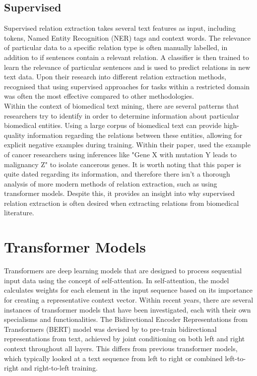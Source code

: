 \documentclass{l4proj}
\begin{document}
\subsection{Supervised}
Supervised relation extraction takes several text features as input, including tokens, Named Entity Recognition (NER) tags and context words. The relevance of particular data to a specific relation type is often manually labelled, in addition to if sentences contain a relevant relation. A classifier is then trained to learn the relevance of particular sentences and is used to predict relations in new text data. Upon their research into different relation extraction methods, \cite{supervised} recognised that using supervised approaches for tasks within a restricted domain was often the most effective compared to other methodologies.
\\
Within the context of biomedical text mining, there are several patterns that researchers try to identify in order to determine information about particular biomedical entities. Using a large corpus of biomedical text can provide high-quality information regarding the relations between these entities, allowing for explicit negative examples during training. Within their paper, \cite{supervised} used the example of cancer researchers using inferences like "Gene X with mutation Y leads to malignancy Z" to isolate cancerous genes. It is worth noting that this paper is quite dated regarding its information, and therefore there isn't a thorough analysis of more modern methods of relation extraction, such as using transformer models. Despite this, it provides an insight into why supervised relation extraction is often desired when extracting relations from biomedical literature.

\section{Transformer Models}
Transformers are deep learning models that are designed to process sequential input data using the concept of self-attention. In self-attention, the model calculates weights for each element in the input sequence based on its importance for creating a representative context vector. Within recent years, there are several instances of transformer models that have been investigated, each with their own specialisms and functionalities. The Bidirectional Encoder Representations from Transformers (BERT) model was devised by \cite{BERT} to pre-train bidirectional representations from text, achieved by joint conditioning on both left and right context throughout all layers. This differs from previous transformer models, which typically looked at a text sequence from left to right or combined left-to-right and right-to-left training.
\end{document}
